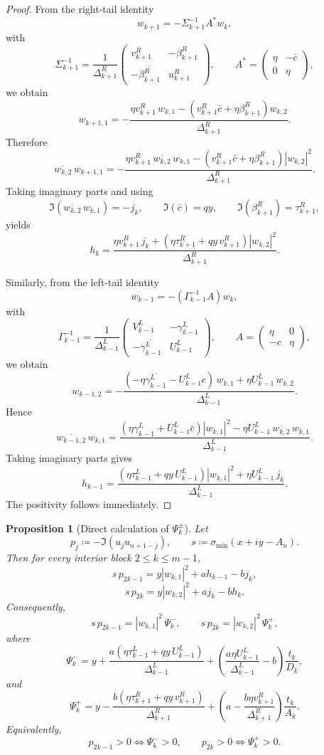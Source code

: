 \documentclass[11pt]{article}
\newtheorem{proposition}[theorem]{Proposition}
\begin{document}
\begin{proof}
From the right-tail identity
\[
w_{k+1}=-\Sigma_{k+1}^{-1}A^*w_k,
\]
with
\[
\Sigma_{k+1}^{-1}
=
\frac1{\Delta_{k+1}^R}
\begin{pmatrix}
v_{k+1}^R & -\beta_{k+1}^R\\
-\overline{\beta_{k+1}^R} & u_{k+1}^R
\end{pmatrix},
\qquad
A^*=
\begin{pmatrix}
\eta & -\bar c\\
0 & \eta
\end{pmatrix},
\]
we obtain
\[
w_{k+1,1}
=
-\frac{
\eta v_{k+1}^R\,w_{k,1}
-(v_{k+1}^R\bar c+\eta\beta_{k+1}^R)w_{k,2}
}{
\Delta_{k+1}^R
}.
\]
Therefore
\[
\overline{w_{k,2}}\,w_{k+1,1}
=
-\frac{
\eta v_{k+1}^R\,\overline{w_{k,2}}\,w_{k,1}
-(v_{k+1}^R\bar c+\eta\beta_{k+1}^R)|w_{k,2}|^2
}{
\Delta_{k+1}^R
}.
\]
Taking imaginary parts and using
\[
\Im(\overline{w_{k,2}}\,w_{k,1})=-j_k,
\qquad
\Im(\bar c)=qy,
\qquad
\Im(\beta_{k+1}^R)=\tau_{k+1}^R,
\]
yields
\[
h_k
=
\frac{
\eta v_{k+1}^R\,j_k
+
(\eta\tau_{k+1}^R+qy\,v_{k+1}^R)|w_{k,2}|^2
}{
\Delta_{k+1}^R
}.
\]

Similarly, from the left-tail identity
\[
w_{k-1}=-(\Gamma_{k-1}^{-1}A)w_k,
\]
with
\[
\Gamma_{k-1}^{-1}
=
\frac1{\Delta_{k-1}^L}
\begin{pmatrix}
V_{k-1}^L & -\gamma_{k-1}^L\\
-\overline{\gamma_{k-1}^L} & U_{k-1}^L
\end{pmatrix},
\qquad
A=
\begin{pmatrix}
\eta & 0\\
-c & \eta
\end{pmatrix},
\]
we obtain
\[
w_{k-1,2}
=
-\frac{
(-\eta\overline{\gamma_{k-1}^L}-U_{k-1}^Lc)\,w_{k,1}
+\eta U_{k-1}^L\,w_{k,2}
}{
\Delta_{k-1}^L
}.
\]
Hence
\[
\overline{w_{k-1,2}}\,w_{k,1}
=
\frac{
(\eta\gamma_{k-1}^L+U_{k-1}^L\bar c)|w_{k,1}|^2
-\eta U_{k-1}^L\,\overline{w_{k,2}}\,w_{k,1}
}{
\Delta_{k-1}^L
}.
\]
Taking imaginary parts gives
\[
h_{k-1}
=
\frac{
(\eta\tau_{k-1}^L+qy\,U_{k-1}^L)|w_{k,1}|^2
+\eta U_{k-1}^L\,j_k
}{
\Delta_{k-1}^L
}.
\]
The positivity follows immediately.
\end{proof}

\begin{proposition}[Direct calculation of \(\Psi_k^\pm\)]
Let
\[
p_j\coloneqq -\Im(u_j u_{n+1-j}),
\qquad
s\coloneqq \sigma_{\min}(x+iy-A_n).
\]
Then for every interior block \(2\le k\le m-1\),
\[
s\,p_{2k-1}
=
y|w_{k,1}|^2+a h_{k-1}-b j_k,
\]
\[
s\,p_{2k}
=
y|w_{k,2}|^2+a j_k-b h_k.
\]
Consequently,
\[
s\,p_{2k-1}=|w_{k,1}|^2\,\Psi_k^-,
\qquad
s\,p_{2k}=|w_{k,2}|^2\,\Psi_k^+,
\]
where
\[
\Psi_k^-
=
y
+
\frac{a(\eta\tau_{k-1}^L+qy\,U_{k-1}^L)}{\Delta_{k-1}^L}
+
\left(
\frac{a\eta U_{k-1}^L}{\Delta_{k-1}^L}-b
\right)\frac{t_k}{D_k},
\]
and
\[
\Psi_k^+
=
y
-
\frac{b(\eta\tau_{k+1}^R+qy\,v_{k+1}^R)}{\Delta_{k+1}^R}
+
\left(
a-\frac{b\eta v_{k+1}^R}{\Delta_{k+1}^R}
\right)\frac{t_k}{A_k}.
\]
Equivalently,
\[
p_{2k-1}>0 \iff \Psi_k^- >0,
\qquad
p_{2k}>0 \iff \Psi_k^+ >0.
\]
\end{proposition}
\end{document}
